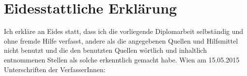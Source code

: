 \chapter{Eidesstattliche Erklärung}
Ich erkläre an Eides statt, dass ich die vorliegende Diplomarbeit selbständig und ohne fremde Hilfe verfasst, andere als die angegebenen Quellen und Hilfsmittel nicht benutzt und die den benutzten Quellen wörtlich und inhaltlich entnommenen Stellen als solche erkenntlich gemacht habe.
\newline
\newline Wien am 15.05.2015
\newline
\newline Unterschriften der VerfasserInnen:
